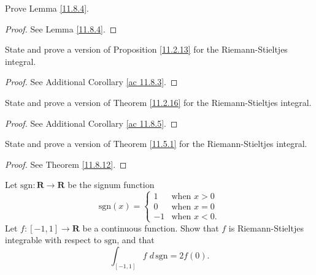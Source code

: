\exercisesection

\begin{exercise}\label{ex 11.8.1}
    Prove Lemma \ref{11.8.4}.
\end{exercise}

\begin{proof}
    See Lemma \ref{11.8.4}.
\end{proof}

\begin{exercise}\label{ex 11.8.2}
    State and prove a version of Proposition \ref{11.2.13} for the Riemann-Stieltjes integral.
\end{exercise}

\begin{proof}
    See Additional Corollary \ref{ac 11.8.3}.
\end{proof}

\begin{exercise}\label{ex 11.8.3}
    State and prove a version of Theorem \ref{11.2.16} for the Riemann-Stieltjes integral.
\end{exercise}

\begin{proof}
    See Additional Corollary \ref{ac 11.8.5}.
\end{proof}

\begin{exercise}\label{ex 11.8.4}
    State and prove a version of Theorem \ref{11.5.1} for the Riemann-Stieltjes integral.
\end{exercise}

\begin{proof}
    See Theorem \ref{11.8.12}.
\end{proof}

\begin{exercise}\label{ex 11.8.5}
    Let \(\text{sgn} : \mathbf{R} \to \mathbf{R}\) be the signum function
    \[
        \text{sgn}(x) = \begin{cases}
            1  & \text{when } x > 0  \\
            0  & \text{when } x = 0  \\
            -1 & \text{when } x < 0.
        \end{cases}
    \]
    Let \(f : [-1, 1] \to \mathbf{R}\) be a continuous function.
    Show that \(f\) is Riemann-Stieltjes integrable with respect to \(\text{sgn}\), and that
    \[
        \int_{[-1, 1]} f \; d \, \text{sgn} = 2f(0).
    \]
\end{exercise}

